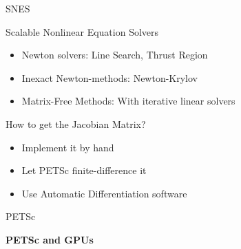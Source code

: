 \begin{frame}{SNES}
  
  \begin{block}{Scalable Nonlinear Equation Solvers}
    \begin{itemize}
     \item Newton solvers: Line Search, Thrust Region
     \item Inexact Newton-methods: Newton-Krylov
     \item Matrix-Free Methods: With iterative linear solvers
    \end{itemize}
  \end{block}
  
  \begin{block}{How to get the Jacobian Matrix?}
    \begin{itemize}
     \item Implement it by hand
     \item Let PETSc finite-difference it
     \item Use Automatic Differentiation software
    \end{itemize}
  \end{block}
\end{frame}



%











%
%
\begin{frame}{PETSc}
   \begin{center} \Large \textbf{PETSc and GPUs} \end{center}
\end{frame}








